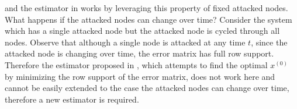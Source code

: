 \documentclass[../../thesis.tex]{subfiles}
\begin{document}
and the estimator in \cite{Fawzi:2014} works by leveraging this property of fixed attacked nodes. \\
What happens if the attacked nodes can change over time? Consider the system which has a single attacked node but the attacked node is cycled through all nodes. 
Observe that although a single node is attacked at any time $t$, since the attacked node is changing over time, the error matrix has full row support. Therefore the estimator proposed in \cite{Fawzi:2014}, which attempts to find the optimal $x^{(0)}$ by minimizing the row support of the error matrix, does not work here and cannot be easily extended to the case the attacked nodes can change over time, therefore a new estimator is required.
\end{document}

